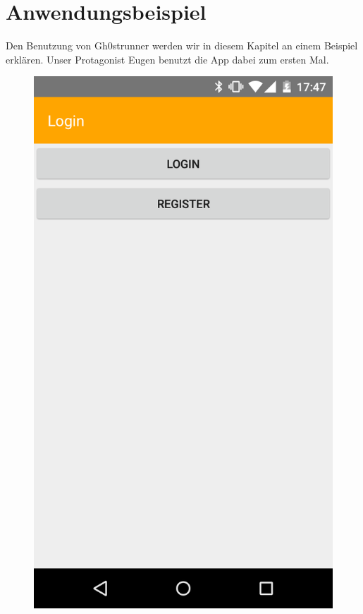 \section{Anwendungsbeispiel}\label{kapitel8}
Den Benutzung von Gh0strunner werden wir in diesem Kapitel an einem Beispiel erklären. Unser Protagonist Eugen benutzt die App dabei zum ersten Mal.

\begin{figure}
\centering
\begin{minipage}{.4\textwidth}
  \centering
  \includegraphics[width=.8\linewidth]{abb/bsp/bsp1}
  \label{fig:bsp1}
\end{minipage}%
\begin{minipage}{.4\textwidth}
  \centering

\end{minipage}
\end{figure}
